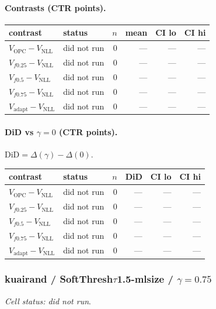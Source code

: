 \documentclass[10pt,a4paper]{article}
\begin{document}
\paragraph{Contrasts (CTR points).}
{\centering\small\begin{tabular}{llrrrr}
\toprule contrast & status & $n$ & mean & CI lo & CI hi \\
\midrule
$V_{\mathrm{OPC}}-V_{\mathrm{NLL}}$ & did not run & 0 & --- & --- & --- \\
$V_{f0.25}-V_{\mathrm{NLL}}$ & did not run & 0 & --- & --- & --- \\
$V_{f0.5}-V_{\mathrm{NLL}}$ & did not run & 0 & --- & --- & --- \\
$V_{f0.75}-V_{\mathrm{NLL}}$ & did not run & 0 & --- & --- & --- \\
$V_{\mathrm{adapt}}-V_{\mathrm{NLL}}$ & did not run & 0 & --- & --- & --- \\
\bottomrule\end{tabular}\par}
\paragraph{DiD vs $\gamma=0$ (CTR points).} $\mathrm{DiD}=\Delta(\gamma)-\Delta(0)$.
{\centering\small\begin{tabular}{llrrrr}
\toprule contrast & status & $n$ & DiD & CI lo & CI hi \\
\midrule
$V_{\mathrm{OPC}}-V_{\mathrm{NLL}}$ & did not run & 0 & --- & --- & --- \\
$V_{f0.25}-V_{\mathrm{NLL}}$ & did not run & 0 & --- & --- & --- \\
$V_{f0.5}-V_{\mathrm{NLL}}$ & did not run & 0 & --- & --- & --- \\
$V_{f0.75}-V_{\mathrm{NLL}}$ & did not run & 0 & --- & --- & --- \\
$V_{\mathrm{adapt}}-V_{\mathrm{NLL}}$ & did not run & 0 & --- & --- & --- \\
\bottomrule\end{tabular}\par}
\bigskip
\subsubsection{kuairand / SoftThresh$\tau$1.5-mlsize / $\gamma=0.75$}
\emph{Cell status: did not run}.
\end{document}
